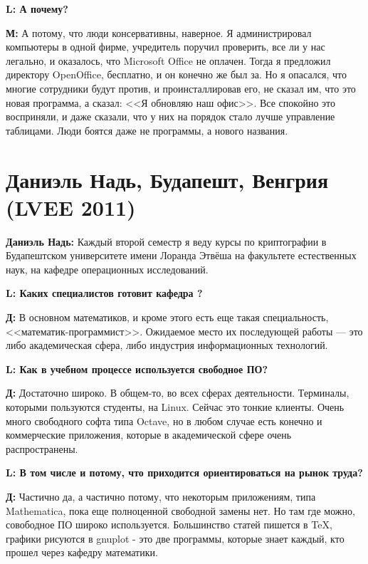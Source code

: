 \documentclass[10pt, a5paper]{article}
\begin{document}
{\noindent \bf L: А почему?}

{\noindent \bf М:} А потому, что люди консервативны, наверное. Я администрировал компьютеры в одной фирме, учредитель поручил проверить, все ли у нас легально, и оказалось, что Microsoft Office не оплачен. Тогда я предложил директору OpenOffice, бесплатно, и он конечно же был за. Но я опасался, что многие сотрудники будут против, и проинсталлировав его, не сказал им, что это новая программа, а сказал: <<Я обновляю наш офис>>. Все спокойно это восприняли, и даже сказали, что у них на порядок стало лучше управление таблицами. Люди боятся даже не программы, а нового названия.

\section[Даниэль Надь, Будапешт, Венгрия (LVEE 2011)]{Даниэль Надь, Будапешт, Венгрия \linebreak (LVEE 2011)}


{\noindent \bf Даниэль Надь:} Каждый второй семестр я веду курсы по криптографии в Будапештском университете имени Лоранда Этвёша на факультете естественных наук, на кафедре операционных исследований.

{\noindent \bf L: Каких специалистов готовит кафедра ?}

{\noindent \bf Д:} В основном математиков, и кроме этого есть еще такая специальность, <<математик-программист>>. Ожидаемое место их последующей работы --- это либо академическая сфера, либо индустрия информационных технологий.

{\noindent \bf L:  Как в учебном процессе используется свободное ПО?}

{\noindent \bf Д:} Достаточно широко. В общем-то, во всех сферах деятельности. Терминалы, которыми пользуются студенты, на Linux. Сейчас это тонкие клиенты. Очень много свободного софта типа Octave, но в любом случае есть конечно и коммерческие приложения, которые в академической сфере очень распространены. 

{\noindent \bf L: В том числе и потому, что приходится ориентироваться на рынок труда?}

{\noindent \bf Д:} Частично да, а частично потому, что некоторым приложениям, типа Mathematica, пока еще полноценной свободной замены нет. Но там где можно, совободное ПО широко используется. Большинство статей пишется в TeX, графики рисуются в gnuplot - это две программы, которые знает каждый, кто прошел через кафедру математики.  
\end{document}
